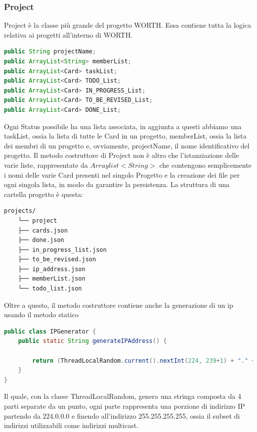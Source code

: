 \documentclass[]{article}
\begin{document}
\subsubsection{Project}
Project è la classe più grande del progetto WORTH. Essa contiene tutta la logica relativa ai progetti all'interno di WORTH.
\begin{lstlisting}[language=java]
public String projectName;
public ArrayList<String> memberList;
public ArrayList<Card> taskList;
public ArrayList<Card> TODO_List;
public ArrayList<Card> IN_PROGRESS_List;
public ArrayList<Card> TO_BE_REVISED_List;
public ArrayList<Card> DONE_List;
\end{lstlisting}
Ogni Status possibile ha una lista associata, in aggiunta a questi abbiamo una taskList, ossia la lista di tutte le Card in un progetto, memberList, ossia la lista dei membri di un progetto e, ovviamente, projectName, il nome identificativo del progetto.
Il metodo costruttore di Project non è altro che l'istanziazione delle varie liste, rappresentate da $Arraylist<String>$ che contengono semplicemente i nomi delle varie Card presenti nel singolo Progetto e la creazione dei file per ogni singola lista, in modo da garantire la persistenza.
La struttura di una cartella progetto è questa:
\begin{lstlisting}[style=ascii-tree,caption={tree projects}]
	projects/
	└── project
	├── cards.json
	├── done.json
	├── in_progress_list.json
	├── to_be_revised.json
	├── ip_address.json
	├── memberList.json
	└── todo_list.json
\end{lstlisting}

Oltre a questo, il metodo costruttore contiene anche la generazione di un ip usando il metodo statico
\begin{lstlisting}[language=java, caption={IPGenerator class}]
public class IPGenerator {
	public static String generateIPAddress() {
		
		return (ThreadLocalRandom.current().nextInt(224, 239+1) + "." + ThreadLocalRandom.current().nextInt(0, 256) + "." + ThreadLocalRandom.current().nextInt(0, 256+1) + "." + ThreadLocalRandom.current().nextInt(0, 256+1));
	}
}
\end{lstlisting}
Il quale, con la classe ThreadLocalRandom, genera una stringa composta da 4 parti separate da un punto, ogni parte rappresenta una porzione di indirizzo IP partendo da 224.0.0.0 e finendo all'indirizzo 255.255.255.255, ossia il subset di indirizzi utilizzabili come indirizzi multicast.
\end{document}
